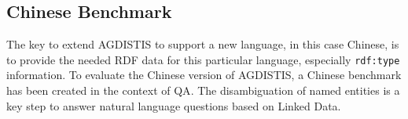 



\subsection{Chinese Benchmark}
\label{sec:chinese}
The key to extend AGDISTIS to support a new language, in this case Chinese, is to provide the needed \ac{RDF} data for this particular language, especially \texttt{rdf:type} information. 
To evaluate the Chinese version of AGDISTIS, a Chinese benchmark has been created in the context of \ac{QA}.
The disambiguation of named entities is a key step to answer natural language questions based on Linked Data. 


